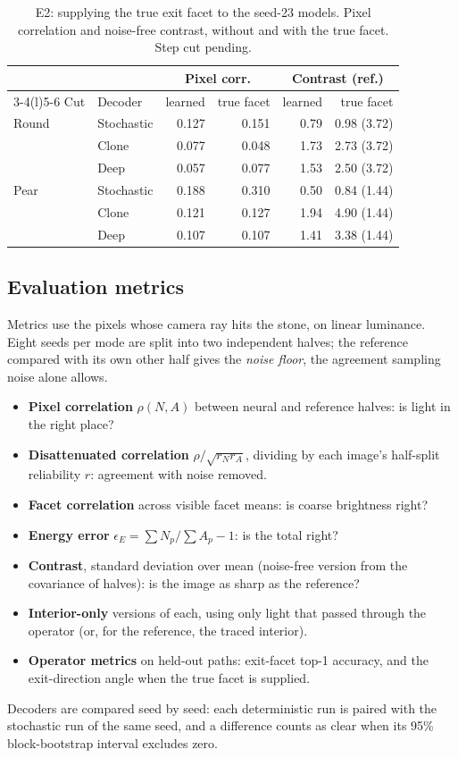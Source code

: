 \documentclass[conference]{IEEEtran}
\begin{document}
\begin{table}[t]
\caption{E2: supplying the true exit facet to the seed-23 models. Pixel
correlation and noise-free contrast, without and with the true facet. Step cut
pending.}
\label{tab:truefacet}
\centering\small
\setlength{\tabcolsep}{3.5pt}
\begin{tabular}{@{}llrrrr@{}}
\toprule
& & \multicolumn{2}{c}{Pixel corr.} & \multicolumn{2}{c}{Contrast (ref.)} \\
\cmidrule(lr){3-4}\cmidrule(l){5-6}
Cut & Decoder & learned & true facet & learned & true facet \\
\midrule
Round & Stochastic & 0.127 & 0.151 & 0.79 & 0.98 (3.72) \\
 & Clone & 0.077 & 0.048 & 1.73 & 2.73 (3.72) \\
 & Deep & 0.057 & 0.077 & 1.53 & 2.50 (3.72) \\
\midrule
Pear & Stochastic & 0.188 & 0.310 & 0.50 & 0.84 (1.44) \\
 & Clone & 0.121 & 0.127 & 1.94 & 4.90 (1.44) \\
 & Deep & 0.107 & 0.107 & 1.41 & 3.38 (1.44) \\
\bottomrule
\end{tabular}
\end{table}

\subsection{Evaluation metrics}
Metrics use the pixels whose camera ray hits the stone, on linear luminance.
Eight seeds per mode are split into two independent halves; the reference
compared with its own other half gives the \emph{noise floor}, the agreement
sampling noise alone allows.
\begin{itemize}
\item \textbf{Pixel correlation} $\rho(N,A)$ between neural and reference
halves: is light in the right place?
\item \textbf{Disattenuated correlation} $\rho/\sqrt{r_Nr_A}$, dividing by
each image's half-split reliability $r$: agreement with noise removed.
\item \textbf{Facet correlation} across visible facet means: is coarse
brightness right?
\item \textbf{Energy error} $\epsilon_E=\sum N_p/\sum A_p-1$: is the total right?
\item \textbf{Contrast}, standard deviation over mean (noise-free version from
the covariance of halves): is the image as sharp as the reference?
\item \textbf{Interior-only} versions of each, using only light that passed
through the operator (or, for the reference, the traced interior).
\item \textbf{Operator metrics} on held-out paths: exit-facet top-1 accuracy,
and the exit-direction angle when the true facet is supplied.
\end{itemize}
Decoders are compared seed by seed: each deterministic run is paired with the
stochastic run of the same seed, and a difference counts as clear when its
95\% block-bootstrap interval excludes zero.
\end{document}

